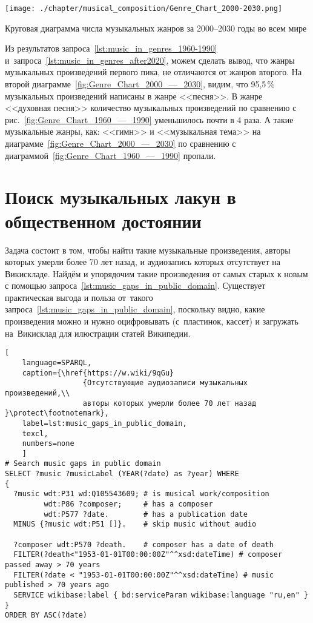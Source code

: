 \begin{marginfigure}[0\baselineskip]
	\texttt{[image: ./chapter/musical\_composition/Genre\_Chart\_2000-2030.png]}
	\caption{Круговая диаграмма числа музыкальных жанров за 2000--2030 годы во всем мире}%
	\label{fig:Genre_Chart_2000_—_2030}%
\end{marginfigure}

Из результатов запроса~\ref{lst:music_in_genres_1960-1990} 
и~запроса~\ref{lst:music_in_genres_after2020}, можем сделать вывод, 
что жанры музыкальных произведений первого пика, не отличаются от жанров второго. 
На второй диаграмме~\ref{fig:Genre_Chart_2000_—_2030}, видим, что 95,5\,\% музыкальных произведений написаны в жанре <<песня>>. В жанре <<духовная песня>> количество музыкальных произведений по сравнению с рис.~\ref{fig:Genre_Chart_1960_—_1990} уменьшилось почти в 4 раза. А такие музыкальные жанры, как: <<гимн>> и <<музыкальная тема>> на диаграмме~\ref{fig:Genre_Chart_2000_—_2030} по сравнению с диаграммой~\ref{fig:Genre_Chart_1960_—_1990} пропали.




\newpage
\section{Поиск музыкальных лакун в общественном достоянии}

Задача состоит в том, чтобы найти такие музыкальные произведения, 
авторы которых умерли более 70 лет назад, 
и аудиозапись которых отсутствует на Викискладе. 
Найдём и упорядочим такие произведения от самых старых к новым 
с помощью запроса~\ref{lst:music_gaps_in_public_domain}. 
Существует практическая выгода и польза от~такого запроса~\ref{lst:music_gaps_in_public_domain}, 
поскольку видно, какие произведения можно и нужно оцифровывать 
(с~пластинок, кассет) и загружать на~Викисклад для илюстрации статей Википедии.

\begin{lstlisting}[ 
    language=SPARQL,
    caption={\href{https://w.wiki/9qGu}
                  {Отсутствующие аудиозаписи музыкальных произведений,\\
                  авторы которых умерли более 70 лет назад }\protect\footnotemark},
    label=lst:music_gaps_in_public_domain,
    texcl,
    numbers=none
    ]
# Search music gaps in public domain
SELECT ?music ?musicLabel (YEAR(?date) as ?year) WHERE 
{
  ?music wdt:P31 wd:Q105543609; # is musical work/composition
         wdt:P86 ?composer;     # has a composer
         wdt:P577 ?date.        # has a publication date
  MINUS {?music wdt:P51 []}.	# skip music without audio 
  
  ?composer wdt:P570 ?death.    # composer has a date of death
  FILTER(?death<"1953-01-01T00:00:00Z"^^xsd:dateTime) # composer passed away > 70 years
  FILTER(?date < "1953-01-01T00:00:00Z"^^xsd:dateTime) # music published > 70 years ago
  SERVICE wikibase:label { bd:serviceParam wikibase:language "ru,en" }
}
ORDER BY ASC(?date)
\end{lstlisting}%

